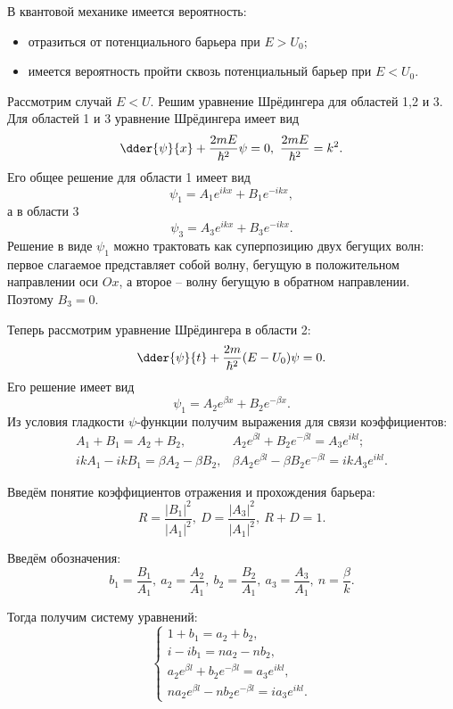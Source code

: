 В квантовой механике имеется вероятность:
\begin{itemize}
    \item отразиться от потенциального барьера при \( E > U_0 \);
    \item имеется вероятность пройти сквозь потенциальный барьер при
    \( E < U_0 \).
\end{itemize}

Рассмотрим случай \( E < U \). Решим уравнение Шрёдингера для областей 1,2 и 3.
Для областей 1 и 3 уравнение Шрёдингера имеет вид
\[
    \dder{\psi}{x} + \frac{2mE}{\hbar^2}\psi = 0,\ \frac{2mE}{\hbar^2} = k^2.
\] 
Его общее решение для области 1 имеет вид
\[
    \psi_1 = A_1 e^{ikx} + B_1 e^{-ikx},
\]
а в области 3
\[
    \psi_3 = A_3 e^{ikx} + B_3 e^{-ikx}.
\]
Решение в виде \( \psi_1 \) можно трактовать как суперпозицию двух бегущих волн:
первое слагаемое представляет собой волну, бегущую в положительном направлении
оси \( Ox \), а второе -- волну бегущую в обратном направлении. Поэтому
\( B_3 = 0 \).

Теперь рассмотрим уравнение Шрёдингера в области 2:
\[
    \dder{\psi}{t} + \frac{2m}{\hbar^2}(E - U_0)\psi = 0.
\]
Его решение имеет вид
\[
    \psi_1 = A_2 e^{\beta x} + B_2 e^{-\beta x}.
\]
Из условия гладкости \( \psi \)-функции получим выражения для связи коэффициентов:
\begin{align*}
    A_1 + B_1 = A_2 + B_2, & A_2 e^{\beta l} + B_2 e^{-\beta l} = A_3 e^{ikl};\\
    ik A_1 - ik B_1 = \beta A_2 - \beta B_2, & \beta A_2 e^{\beta l} - \beta
    B_2 e^{-\beta l} = ik A_3 e^{ikl}. 
\end{align*}

Введём понятие коэффициентов отражения и прохождения барьера:
\[
    R = \frac{|B_1|^2}{|A_1|^2},\ 
    D = \frac{|A_3|^2}{|A_1|^2},\ 
    R + D = 1.
\]

Введём обозначения:
\[
    b_1 = \frac{B_1}{A_1},\ a_2 = \frac{A_2}{A_1},\ b_2 = \frac{B_2}{A_1},\ 
    a_3 = \frac{A_3}{A_1},\ n = \frac{\beta}{k}.
\]

Тогда получим систему уравнений:
\[
    \left\{
    \begin{array}{l}
        1 + b_1 = a_2 + b_2, \\
        i - ib_1 = n a_2 - n b_2, \\
        a_2 e^{\beta l} + b_2 e^{-\beta l} = a_3 e^{ikl}, \\
        na_2 e^{\beta l} - nb_2e^{-\beta l} = ia_3 e^{ikl}.
    \end{array}
    \right.
\]

